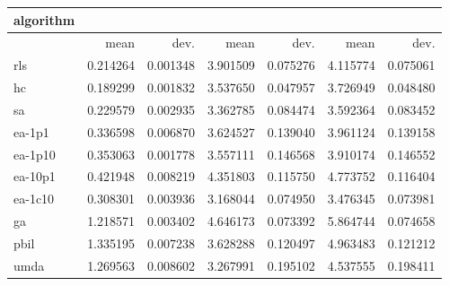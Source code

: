 \begin{tabular}{@{}l*{6}{>{{}}N{1}{2}}@{}}
\toprule
{algorithm} &  &  &  \\
\midrule
& {mean} & {dev.} & {mean} & {dev.} & {mean} & {dev.} \\
\midrule
rls & 0.214264 & 0.001348 & 3.901509 & 0.075276 & 4.115774 & 0.075061 \\
 hc & 0.189299 & 0.001832 & 3.537650 & 0.047957 & 3.726949 & 0.048480 \\
 sa & 0.229579 & 0.002935 & 3.362785 & 0.084474 & 3.592364 & 0.083452 \\
 ea-1p1 & 0.336598 & 0.006870 & 3.624527 & 0.139040 & 3.961124 & 0.139158 \\
 ea-1p10 & 0.353063 & 0.001778 & 3.557111 & 0.146568 & 3.910174 & 0.146552 \\
 ea-10p1 & 0.421948 & 0.008219 & 4.351803 & 0.115750 & 4.773752 & 0.116404 \\
 ea-1c10 & 0.308301 & 0.003936 & 3.168044 & 0.074950 & 3.476345 & 0.073981 \\
 ga & 1.218571 & 0.003402 & 4.646173 & 0.073392 & 5.864744 & 0.074658 \\
 pbil & 1.335195 & 0.007238 & 3.628288 & 0.120497 & 4.963483 & 0.121212 \\
 umda & 1.269563 & 0.008602 & 3.267991 & 0.195102 & 4.537555 & 0.198411 \\
 \bottomrule
\end{tabular}
